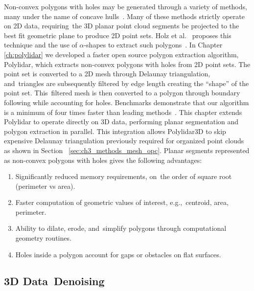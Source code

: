 Non-convex polygons with holes may be generated through a variety of methods, many under the name of concave hulls~\cite{edelsbrunner_shape_1983, furieri_spatialite_2017, open_source_geospatial_foundation_postgis_2019}. Many of these methods strictly operate on 2D data, requiring~the 3D planar point cloud segments be projected to the best fit geometric plane to produce 2D point sets. Holz et al.~\cite{lee_fast_2013} proposes this technique and the use of $\alpha$-shapes to extract such polygons~\cite{edelsbrunner_shape_1983}.  In Chapter \ref{ch:polylidar} we developed a faster open source polygon extraction algorithm, Polylidar, which extracts non-convex polygons with holes from 2D point sets. The point set is converted to a 2D mesh through Delaunay triangulation, and~triangles are subsequently filtered by edge length creating the ``shape'' of the point set. This~filtered mesh is then converted to a polygon through boundary following while accounting for holes. Benchmarks demonstrate that our algorithm is a minimum of four times faster than leading methods~\cite{polylidar_benchmark_concave}. This chapter extends Polylidar to operate directly on 3D data, performing planar segmentation and polygon extraction in parallel. This integration allows Polylidar3D to skip expensive Delaunay triangulation previously required for organized point clouds as shown in Section ~\ref{sec:ch3_methods_mesh_opc}.  Planar segments represented as non-convex polygons with holes gives the following advantages:

\begin{enumerate}
    \item Significantly reduced memory requirements, on~the order of square root (perimeter vs area).
    \item Faster computation of geometric values of interest, e.g.,~centroid, area, perimeter.
    \item Ability to dilate, erode, and~simplify polygons through computational geometry routines.
    \item Holes inside a polygon account for gaps or obstacles on flat surfaces.
\end{enumerate}

\subsection{3D Data~Denoising}\label{sec:ch3_bg_mesh_smoothing}

